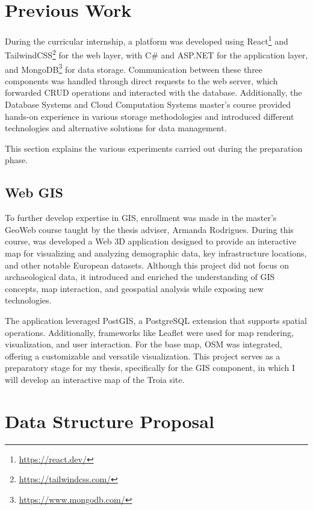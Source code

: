 \section{Previous Work}
\label{sec:previous_work}

During the curricular internship, a platform was developed using React\footnote{\url{https://react.dev/}} and TailwindCSS\footnote{\url{https://tailwindcss.com/}} for the web layer, with C\# and ASP.NET for the application layer, and MongoDB\footnote{\url{https://www.mongodb.com/}} for data storage. Communication between these three components was handled through direct requests to the web server, which forwarded \gls{CRUD} operations and interacted with the database.  
Additionally, the Database Systems and Cloud Computation Systems master's course provided hands-on experience in various storage methodologies and introduced different technologies and alternative solutions for data management.

This section explains the various experiments carried out during the preparation phase.

\subsection{Web \gls{GIS}}
\label{sec:gis_previous} 

To further develop expertise in \gls{GIS}, enrollment was made in the master's GeoWeb course taught by the thesis adviser, Armanda Rodrigues. During this course, was developed a Web \gls{3D} application designed to provide an interactive map for visualizing and analyzing demographic data, key infrastructure locations, and other notable European datasets. Although this project did not focus on archaeological data, it introduced and enriched the understanding of GIS concepts, map interaction, and geospatial analysis while exposing new technologies.

The application leveraged PostGIS, a PostgreSQL extension that supports spatial operations.
Additionally, frameworks like Leaflet were used for map rendering, visualization, and user interaction. For the base map, \gls{OSM} was integrated, offering a customizable and versatile visualization. This project serves as a preparatory stage for my thesis, specifically for the \gls{GIS} component, in which I will develop an interactive map of the Troia site.

\section{Data Structure Proposal}
\label{sec:data_strucutre}

